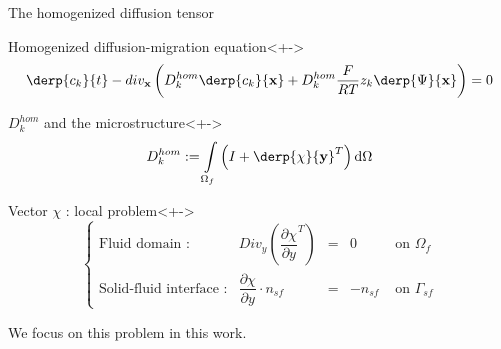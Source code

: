 \begin{frame}{The homogenized diffusion tensor}
%
\begin{block}{Homogenized diffusion-migration equation}<+->
\[\derp{c_k}{t}-div_{\mathbf{x}}\left(D_k^{hom}\derp{c_k}{\mathbf{x}}+D_k^{hom}\frac{F}{RT}z_k \derp{\Psi}{\mathbf{x}}\right)=0\]
\end{block}
\begin{block}{$D_k^{hom}$ and the microstructure}<+->%
\[D_k^{hom}:=\int\limits_{\Omega_f}\left(I+\derp{\chi}{\mathbf{y}}^T\right)\text{d}\Omega\]
\end{block}
%
\begin{block}{Vector $\chi$ : local problem}<+->
\vspace{-0.3cm}
\[%
\left\{%
\begin{array}{llccr}
\text{Fluid domain :}&Div_y \left( \dfrac{\partial{\chi}}{\partial{y}}^T\right) &=& 0&\text{ on }\Omega_f \\
\text{Solid-fluid interface :}&\dfrac{\partial{\chi}}{\partial{y}} \cdot n_{sf}&=&-n_{sf}&\text{ on }\Gamma_{sf}
\end{array}
\right.
\]

We focus on this problem in this work.
\end{block}
%
\end{frame}

